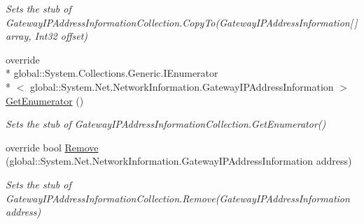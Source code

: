 \begin{DoxyCompactItemize}
\begin{DoxyCompactList}\small\item\em Sets the stub of Gateway\-I\-P\-Address\-Information\-Collection.\-Copy\-To(\-Gateway\-I\-P\-Address\-Information\mbox{[}$\,$\mbox{]} array, Int32 offset)\end{DoxyCompactList}\item 
override \\*
global\-::\-System.\-Collections.\-Generic.\-I\-Enumerator\\*
$<$ global\-::\-System.\-Net.\-Network\-Information.\-Gateway\-I\-P\-Address\-Information $>$ \hyperlink{class_system_1_1_net_1_1_network_information_1_1_fakes_1_1_stub_gateway_i_p_address_information_collection_a670016e04f49337725f43a451fe7f84d}{Get\-Enumerator} ()
\begin{DoxyCompactList}\small\item\em Sets the stub of Gateway\-I\-P\-Address\-Information\-Collection.\-Get\-Enumerator()\end{DoxyCompactList}\item 
override bool \hyperlink{class_system_1_1_net_1_1_network_information_1_1_fakes_1_1_stub_gateway_i_p_address_information_collection_a3b50417490b28213973911f404450aed}{Remove} (global\-::\-System.\-Net.\-Network\-Information.\-Gateway\-I\-P\-Address\-Information address)
\begin{DoxyCompactList}\small\item\em Sets the stub of Gateway\-I\-P\-Address\-Information\-Collection.\-Remove(\-Gateway\-I\-P\-Address\-Information address)\end{DoxyCompactList}\end{DoxyCompactItemize}
